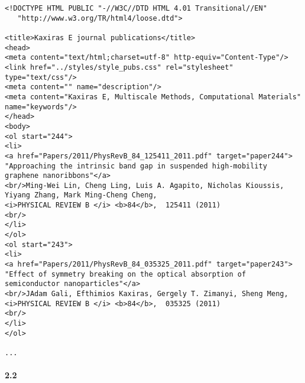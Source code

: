 \documentclass[11pt]{article}
\begin{document}
\begin{verbatim}
<!DOCTYPE HTML PUBLIC "-//W3C//DTD HTML 4.01 Transitional//EN"
   "http://www.w3.org/TR/html4/loose.dtd">

<title>Kaxiras E journal publications</title>
<head>
<meta content="text/html;charset=utf-8" http-equiv="Content-Type"/>
<link href="../styles/style_pubs.css" rel="stylesheet" type="text/css"/>
<meta content="" name="description"/>
<meta content="Kaxiras E, Multiscale Methods, Computational Materials" name="keywords"/>
</head>
<body>
<ol start="244">
<li>
<a href="Papers/2011/PhysRevB_84_125411_2011.pdf" target="paper244">
"Approaching the intrinsic band gap in suspended high-mobility graphene nanoribbons"</a>
<br/>Ming-Wei Lin, Cheng Ling, Luis A. Agapito, Nicholas Kioussis, Yiyang Zhang, Mark Ming-Cheng Cheng,
<i>PHYSICAL REVIEW B </i> <b>84</b>,  125411 (2011)
<br/>
</li>
</ol>
<ol start="243">
<li>
<a href="Papers/2011/PhysRevB_84_035325_2011.pdf" target="paper243">
"Effect of symmetry breaking on the optical absorption of semiconductor nanoparticles"</a>
<br/>JAdam Gali, Efthimios Kaxiras, Gergely T. Zimanyi, Sheng Meng,
<i>PHYSICAL REVIEW B </i> <b>84</b>,  035325 (2011)
<br/>
</li>
</ol>

...
\end{verbatim}

    \paragraph{2.2}\label{section}
\end{document}
